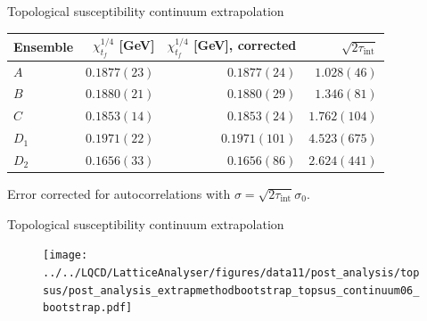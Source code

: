 \documentclass[10pt,show notes on second screen]{beamer}
\begin{document}
\begin{frame}{Topological susceptibility continuum extrapolation}
\begin{table}
    \centering
    \begin{tabular}{l r r r}
        \toprule
        Ensemble     & $\chi_{t_f}^{1/4}$ [GeV] & $\chi_{t_f}^{1/4}$ [GeV], corrected & $\sqrt{2\tau_\mathrm{int}}$\\
        \midrule
        $A$          & $0.1877(23)$ & $0.1877(24)$  & $1.028(46)$  \\
        $B$          & $0.1880(21)$ & $0.1880(29)$  & $1.346(81)$  \\
        $C$          & $0.1853(14)$ & $0.1853(24)$  & $1.762(104)$ \\
        $D_1$        & $0.1971(22)$ & $0.1971(101)$ & $4.523(675)$ \\
        $D_2$        & $0.1656(33)$ & $0.1656(86)$  & $2.624(441)$ \\
        \bottomrule
    \end{tabular}
\end{table}
Error corrected for autocorrelations with $\sigma = \sqrt{2 \tau_\mathrm{int}} \sigma_0$.
\end{frame}

\begin{frame}{Topological susceptibility continuum extrapolation}
\begin{figure}
    \centering
    \texttt{[image: ../../LQCD/LatticeAnalyser/figures/data11/post\_analysis/topsus/post\_analysis\_extrapmethodbootstrap\_topsus\_continuum06\_bootstrap.pdf]}
\end{figure}
\end{frame}
\end{document}
